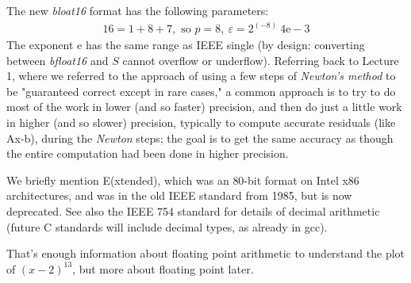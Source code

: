 \documentclass[11pt]{article}
\numberwithin{equation}{section}
\begin{document}
The new \textit{bloat16} format has the following parameters: \begin{align*}
    16 = 1+8+7,\text{ so }p=8,\  \varepsilon = 2^(-8) ~ 4\mathrm{e}-3
\end{align*}
The exponent $\mathrm{e}$ has the same range as IEEE single (by design: converting between \textit{bfloat16} and $S$ cannot overflow or underflow).
Referring back to Lecture 1, where we referred to the approach of using a few steps of \textit{Newton's method} to be "guaranteed correct except in rare cases," 
a common approach is to try to do most of the work in lower (and so faster) precision, and then do just a little work in higher (and so slower) precision,
typically to compute accurate residuals (like Ax-b), during the \textit{Newton} steps; the goal is to get the same accuracy as though the entire computation had been done in higher precision.

We briefly mention E(xtended), which was an $80$-bit format on Intel x86 architectures, and was in the old IEEE standard from 1985, but is now deprecated. 
See also the IEEE 754 standard for details of decimal arithmetic (future C standards will include decimal types, as already in gcc).

That's enough information about floating point arithmetic to understand the plot of $(x-2)^{13}$, but more about floating point later.
\end{document}

